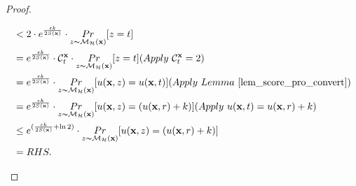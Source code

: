 \documentclass{article}
\begin{document}
\begin{proof}
\begin{itemize}
\begin{equation*}
\begin{split}
        & < 2 \cdot e^{\frac{\epsilon k}{2 S(\dataobs)}} \cdot \hexpmechPr{\dataobs}{z = t}\\
        & = e^{\frac{\epsilon k}{2 S(\dataobs)}} \cdot \cardinality{\dataobs}{t} \cdot \hexpmechPr{\dataobs}{z = t}   (Apply \ \cardinality{\dataobs}{t} = 2)\\
        & = e^{\frac{\epsilon k}{2 S(\dataobs)}} \cdot \hexpmechPr{\dataobs}{\ux{z} = \ux{t}}         (Apply \ Lemma\ \ref{lem_score_pro_convert})\\
        & = e^{\frac{\epsilon k}{2 S(\dataobs)}} \cdot \hexpmechPr{\dataobs}{\ux{z} = (\ux{r} + k)}   (Apply \ \ux{t} = \ux{r} + k)\\
        & \leq e^{(\frac{\epsilon k}{2 S(\dataobs)} + \ln 2)} \cdot \hexpmechPr{\dataobs}{\ux{z} = ( \ux{r} + k)}\\
        & = RHS.
        \end{split}
        \end{equation*}


\end{itemize}
\end{proof}
\end{document}
